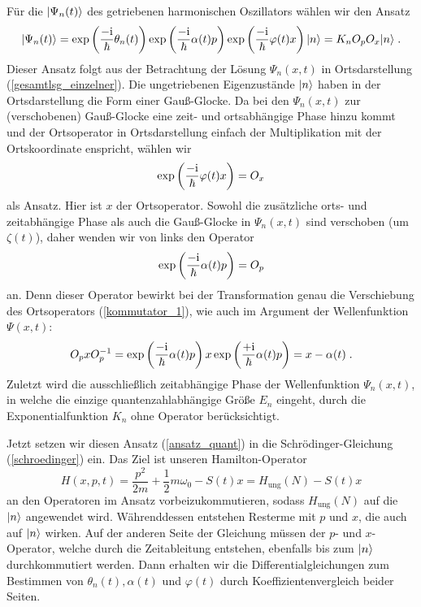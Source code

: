   Für die $\lvert\Psi_n(t)\rangle$ des getriebenen harmonischen Oszillators wählen wir den Ansatz
  \begin{equation}
    \lvert\Psi_n(t)\rangle=\exp\left(\frac{-\text i}{\hbar}\theta_n(t)\right)\exp\left(\frac{-\text i}{\hbar}\alpha(t)p\right)\exp\left(\frac{-\text i}{\hbar}\varphi(t)x\right)\lvert n\rangle=K_nO_pO_x\lvert n\rangle \;.
    \label{ansatz_quant}
  \end{equation}
  Dieser Ansatz folgt aus der Betrachtung der Lösung $\Psi_n(x,t)$ in Ortsdarstellung (\ref{gesamtlsg_einzelner}).
  Die ungetriebenen Eigenzustände $\lvert n\rangle$ haben in der Ortsdarstellung die Form einer Gauß-Glocke.
  Da bei den $\Psi_n(x,t)$ zur (verschobenen) Gauß-Glocke eine zeit- und ortsabhängige Phase hinzu kommt und der Ortsoperator in Ortsdarstellung einfach der Multiplikation mit der Ortskoordinate enspricht, wählen wir
  \begin{equation}
    \exp\left(\frac{-\text i}{\hbar}\varphi(t)x\right)=O_x
  \end{equation}
  als Ansatz.
  Hier ist $x$ der Ortsoperator.
  Sowohl die zusätzliche orts- und zeitabhängige Phase als auch die Gauß-Glocke in $\Psi_n(x,t)$ sind verschoben (um $\zeta(t)$), daher wenden wir von links den Operator
  \begin{equation}
    \exp\left(\frac{-\text i}{\hbar}\alpha(t)p\right)=O_p
  \end{equation}
  an.
  Denn dieser Operator bewirkt bei der Transformation genau die Verschiebung des Ortsoperators (\ref{kommutator_1}), wie auch im Argument der Wellenfunktion $\Psi(x,t)$:
  \begin{equation}
    O_pxO_p^{-1}=
    \exp\left(\frac{-\text i}{\hbar}\alpha(t)p\right) x  \exp\left(\frac{+\text i}{\hbar}\alpha(t)p\right)
    =x-\alpha(t) \; .
    \label{verschiebung_x}
  \end{equation}
  Zuletzt wird die ausschließlich zeitabhängige Phase der Wellenfunktion $\Psi_n(x,t)$, in welche die einzige quantenzahlabhängige Größe $E_n$ eingeht, durch die Exponentialfunktion $K_n$ ohne Operator berücksichtigt.

  Jetzt setzen wir diesen Ansatz (\ref{ansatz_quant}) in die Schrödinger-Gleichung (\ref{schroedinger}) ein.
  Das Ziel ist unseren Hamilton-Operator
  \begin{equation}
    H(x,p,t)=\frac{p^2}{2m}+\frac 1 2 m\omega_0 -S(t)x = H_{\text{ung}}(N)-S(t)x
  \end{equation}
  an den Operatoren im Ansatz vorbeizukommutieren, sodass $H_{\text{ung}}(N)$ auf die $\lvert n\rangle$ angewendet wird.
  Währenddessen entstehen Resterme mit $p$ und $x$, die auch auf $\lvert n\rangle$ wirken.
  Auf der anderen Seite der Gleichung müssen der $p$- und $x$-Operator, welche durch die Zeitableitung entstehen, ebenfalls bis zum $\lvert n\rangle$ durchkommutiert werden.
  Dann erhalten wir die Differentialgleichungen zum Bestimmen von $\theta_n(t), \alpha(t)$ und $\varphi(t)$ durch Koeffizientenvergleich beider Seiten.


